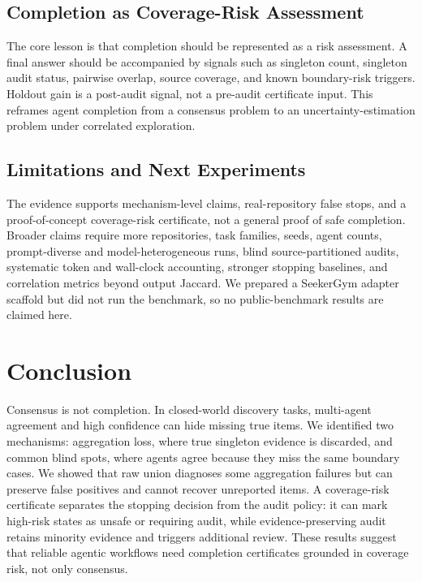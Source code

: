 \documentclass[letterpaper]{article}
\begin{document}
\subsection{Completion as Coverage-Risk Assessment}

The core lesson is that completion should be represented as a risk assessment.
A final answer should be accompanied by signals such as singleton count,
singleton audit status, pairwise overlap, source coverage, and known
boundary-risk triggers. Holdout gain is a post-audit signal, not a pre-audit
certificate input. This reframes agent completion from a consensus problem to an
uncertainty-estimation problem under correlated exploration.

\subsection{Limitations and Next Experiments}

The evidence supports mechanism-level claims, real-repository false stops, and a
proof-of-concept coverage-risk certificate, not a general proof of safe
completion. Broader claims require more repositories, task families, seeds,
agent counts, prompt-diverse and model-heterogeneous runs, blind
source-partitioned audits, systematic token and wall-clock accounting, stronger
stopping baselines, and correlation metrics beyond output Jaccard.
We prepared a SeekerGym adapter scaffold but did not run the benchmark, so no
public-benchmark results are claimed here.

\section{Conclusion}

Consensus is not completion. In closed-world discovery tasks, multi-agent
agreement and high confidence can hide missing true items. We identified two
mechanisms: aggregation loss, where true singleton evidence is discarded, and
common blind spots, where agents agree because they miss the same boundary
cases. We showed that raw union diagnoses some aggregation failures but can
preserve false positives and cannot recover unreported items. A coverage-risk
certificate separates the stopping decision from the audit policy: it can mark
high-risk states as unsafe or requiring audit, while evidence-preserving audit
retains minority evidence and triggers additional review. These results suggest
that reliable agentic workflows need completion certificates grounded in
coverage risk, not only consensus.


\end{document}
